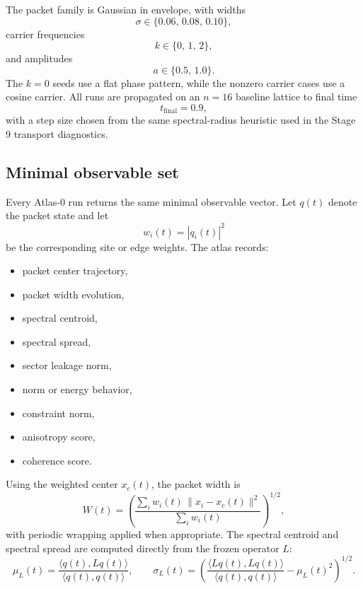 \documentclass[11pt]{article}
\begin{document}
The packet family is Gaussian in envelope, with widths
\begin{equation}
\sigma \in \{0.06,\,0.08,\,0.10\},
\end{equation}
carrier frequencies
\begin{equation}
k \in \{0,\,1,\,2\},
\end{equation}
and amplitudes
\begin{equation}
a \in \{0.5,\,1.0\}.
\end{equation}
The $k=0$ seeds use a flat phase pattern, while the nonzero carrier cases use a cosine carrier. All runs are propagated on an $n=16$ baseline lattice to final time
\begin{equation}
t_{\mathrm{final}} = 0.9,
\end{equation}
with a step size chosen from the same spectral-radius heuristic used in the Stage 9 transport diagnostics.

\subsection{Minimal observable set}
Every Atlas-0 run returns the same minimal observable vector. Let $q(t)$ denote the packet state and let
\begin{equation}
w_i(t) = |q_i(t)|^2
\end{equation}
be the corresponding site or edge weights. The atlas records:
\begin{itemize}
\item packet center trajectory,
\item packet width evolution,
\item spectral centroid,
\item spectral spread,
\item sector leakage norm,
\item norm or energy behavior,
\item constraint norm,
\item anisotropy score,
\item coherence score.
\end{itemize}

Using the weighted center $x_c(t)$, the packet width is
\begin{equation}
W(t) = \left( \frac{\sum_i w_i(t)\,\|x_i - x_c(t)\|^2}{\sum_i w_i(t)} \right)^{1/2},
\end{equation}
with periodic wrapping applied when appropriate. The spectral centroid and spectral spread are computed directly from the frozen operator $L$:
\begin{equation}
\mu_L(t) = \frac{\langle q(t),Lq(t)\rangle}{\langle q(t),q(t)\rangle},
\qquad
\sigma_L(t) = \left(
\frac{\langle Lq(t),Lq(t)\rangle}{\langle q(t),q(t)\rangle}
- \mu_L(t)^2
\right)^{1/2}.
\end{equation}
\end{document}
